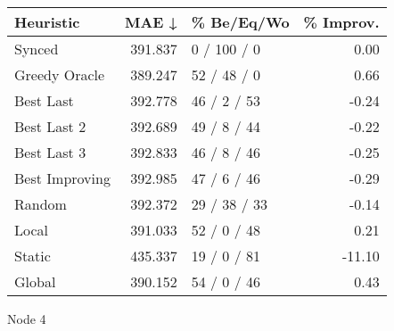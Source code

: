 \begin{tabular}{lrlr}
\toprule
\textbf{Heuristic} & \textbf{MAE ↓} & \textbf{\% Be/Eq/Wo} & \textbf{\% Improv.} \\
\midrule
            Synced &        391.837 &          0 / 100 / 0 &                0.00 \\
     Greedy Oracle &        389.247 &          52 / 48 / 0 &                0.66 \\
         Best Last &        392.778 &          46 / 2 / 53 &               -0.24 \\
       Best Last 2 &        392.689 &          49 / 8 / 44 &               -0.22 \\
       Best Last 3 &        392.833 &          46 / 8 / 46 &               -0.25 \\
    Best Improving &        392.985 &          47 / 6 / 46 &               -0.29 \\
            Random &        392.372 &         29 / 38 / 33 &               -0.14 \\
             Local &        391.033 &          52 / 0 / 48 &                0.21 \\
            Static &        435.337 &          19 / 0 / 81 &              -11.10 \\
            Global &        390.152 &          54 / 0 / 46 &                0.43 \\
\bottomrule
\end{tabular}
\caption{Node 4}
\label{tab:non_lr05_le1_bs4_4}

